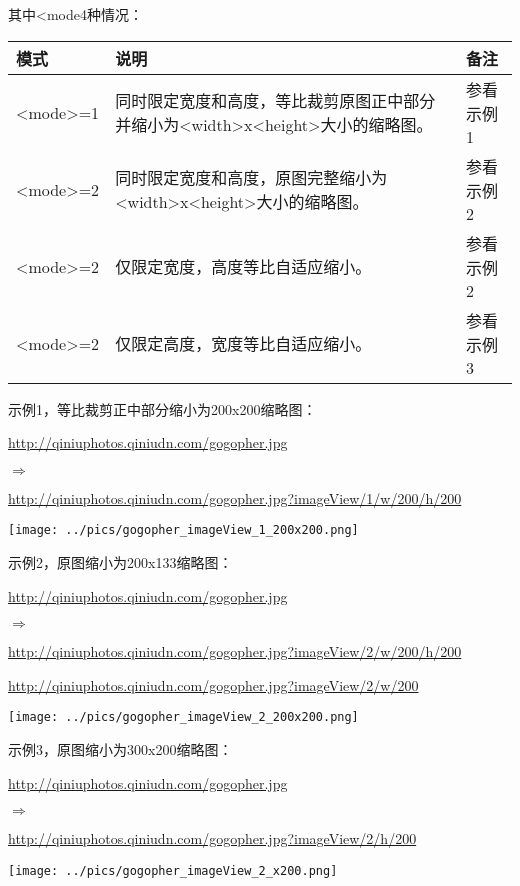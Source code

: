 \documentclass[11pt, oneside]{book}
\newcommand{\qpar}[1]{
\vspace{0.25em}
\noindent
#1\par
\vspace{0.25em}
}
\newcommand{\qurl}[1]{\url{#1}}
\newcommand{\qtable}[1]{\vspace{0.5em}#1\vspace{0.5em}}
\begin{document}
\begin{CJK*}{UTF8}{song}
\qpar{其中\textless mode4种情况：}
\qtable{
\def\arraystretch{1.5}
\begin{tabular}{|l|p{22em}|l|}
\hline
模式 & 说明 & 备注 \\
\hline
\textless mode\textgreater=1 & 同时限定宽度和高度，等比裁剪原图正中部分并缩小为\textless width\textgreater x\textless height\textgreater 大小的缩略图。& 参看示例1 \\
\hline
\textless mode\textgreater=2 & 同时限定宽度和高度，原图完整缩小为\textless width\textgreater x\textless height\textgreater 大小的缩略图。& 参看示例2 \\
\hline
\textless mode\textgreater=2 & 仅限定宽度，高度等比自适应缩小。 & 参看示例2 \\
\hline
\textless mode\textgreater=2 & 仅限定高度，宽度等比自适应缩小。 & 参看示例3 \\
\hline
\end{tabular}
}

\clearpage

\qpar{示例1，等比裁剪正中部分缩小为200x200缩略图：}
\qpar{\qurl{http://qiniuphotos.qiniudn.com/gogopher.jpg}}
\qpar{$\Rightarrow$}
\qpar{\qurl{http://qiniuphotos.qiniudn.com/gogopher.jpg?imageView/1/w/200/h/200}}

\begin{center}
\texttt{[image: ../pics/gogopher\_imageView\_1\_200x200.png]}
\end{center}

\qpar{示例2，原图缩小为200x133缩略图：}
\qpar{\qurl{http://qiniuphotos.qiniudn.com/gogopher.jpg}}
\qpar{$\Rightarrow$}
\qpar{\qurl{http://qiniuphotos.qiniudn.com/gogopher.jpg?imageView/2/w/200/h/200}}
\qpar{\qurl{http://qiniuphotos.qiniudn.com/gogopher.jpg?imageView/2/w/200}}

\begin{center}
\texttt{[image: ../pics/gogopher\_imageView\_2\_200x200.png]}
\end{center}

\clearpage

\qpar{示例3，原图缩小为300x200缩略图：}
\qpar{\qurl{http://qiniuphotos.qiniudn.com/gogopher.jpg}}
\qpar{$\Rightarrow$}
\qpar{\qurl{http://qiniuphotos.qiniudn.com/gogopher.jpg?imageView/2/h/200}}

\begin{center}
\texttt{[image: ../pics/gogopher\_imageView\_2\_x200.png]}
\end{center}

\end{CJK*}
\end{document}
